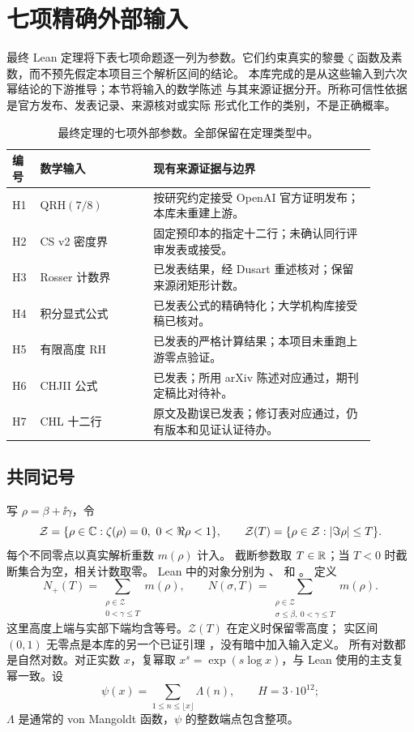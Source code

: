 \section{七项精确外部输入}
\label{sec:inputs}

最终 Lean 定理将下表七项命题逐一列为参数。它们约束真实的黎曼
$\zeta$ 函数及素数，而不预先假定本项目三个解析区间的结论。
本库完成的是从这些输入到六次幂结论的下游推导；本节将输入的数学陈述
与其来源证据分开。所称可信性依据是官方发布、发表记录、来源核对或实际
形式化工作的类别，不是正确概率。

\begin{table}[htbp]
\centering\small
\caption{最终定理的七项外部参数。全部保留在定理类型中。}
\label{tab:inputs}
\begin{tabular}{p{0.06\linewidth}p{0.28\linewidth}p{0.55\linewidth}}
\toprule
编号 & 数学输入 & 现有来源证据与边界 \\
\midrule
H1 & QRH$(7/8)$ & 按研究约定接受 OpenAI 官方证明发布；本库未重建上游。 \\
H2 & CS v2 密度界 & 固定预印本的指定十二行；未确认同行评审发表或接受。 \\
H3 & Rosser 计数界 & 已发表结果，经 Dusart 重述核对；保留来源闭矩形计数。 \\
H4 & 积分显式公式 & 已发表公式的精确特化；大学机构库接受稿已核对。 \\
H5 & 有限高度 RH & 已发表的严格计算结果；本项目未重跑上游零点验证。 \\
H6 & CHJII 公式 & 已发表；所用 arXiv 陈述对应通过，期刊定稿比对待补。 \\
H7 & CHL 十二行 & 原文及勘误已发表；修订表对应通过，仍有版本和见证认证待办。 \\
\bottomrule
\end{tabular}
\end{table}

\subsection{共同记号}

写 $\rho=\beta+\ii\gamma$，令
\[
\mathcal Z=\{\rho\in\C:\zeta(\rho)=0,\ 0<\Re\rho<1\},\qquad
\mathcal Z(T)=\{\rho\in\mathcal Z:|\Im\rho|\le T\}.
\]
每个不同零点以真实解析重数 $m(\rho)$ 计入。
截断参数取 $T\in\mathbb R$；当 $T<0$ 时截断集合为空，相关计数取零。
Lean 中的对象分别为
、
 和
。
定义
\begin{equation}
\label{eq:zero-counts}
N_+(T)=\sum_{\substack{\rho\in\mathcal Z\\0<\gamma\le T}}m(\rho),
\qquad
N(\sigma,T)=\sum_{\substack{\rho\in\mathcal Z\\\sigma\le\beta,\ 0<\gamma\le T}}m(\rho).
\end{equation}
这里高度上端与实部下端均含等号。$\mathcal Z(T)$ 在定义时保留零高度；
实区间 $(0,1)$ 无零点是本库的另一个已证引理
，没有暗中加入输入定义。
所有对数都是自然对数。对正实数 $x$，复幂取
$x^s=\exp(s\log x)$，与 Lean 使用的主支复幂一致。设
\[
\psi(x)=\sum_{1\le n\le\lfloor x\rfloor}\Lambda(n),\qquad
H=3\cdot10^{12};
\]
$\Lambda$ 是通常的 von Mangoldt 函数，$\psi$ 的整数端点包含整项。

